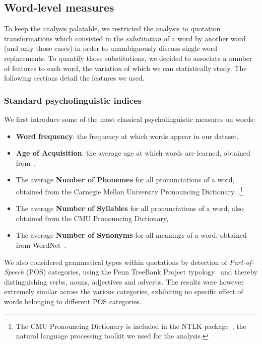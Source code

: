 \subsection{Word-level measures}

To keep the analysis palatable, we restricted the analysis to quotation transformations which consisted in the \emph{substitution} of a word by another word (and only those cases) in order to unambiguously discuss single word replacements. 
To quantify those substitutions, we decided to associate a number of features to each word, the variation of which we can statistically study.
The following sections detail the features we used.

\subsubsection{Standard psycholinguistic indices}

We first introduce some of the most classical psycholinguistic measures on words:


\begin{itemize}
    \item \textbf{Word frequency}: the frequency at which words appear in our dataset, 
    \item \textbf{Age of Acquisition}: the average age at which words are learned, obtained from~\citet{kuperman12},
    \item The average \textbf{Number of Phonemes} for all pronunciations of a word, obtained from the Carnegie Mellon University Pronouncing Dictionary~\citep{Weide98},\footnote{The CMU Pronouncing Dictionary is included in the NTLK package~\citep{Bird09}, the natural language processing toolkit we used for the analysis.}
    \item The average \textbf{Number of Syllables} for all pronunciations of a word, also obtained from the CMU Pronouncing Dictionary,
    \item The average \textbf{Number of Synonyms} for all meanings of a word, obtained from WordNet~\citep{WordNet10}. 
\end{itemize}

We also considered grammatical types within quotations by detection of \emph{Part-of-Speech} (POS) categories, using the Penn TreeBank Project typology~\citep{Santorini90} and thereby distinguishing verbs, nouns, adjectives and adverbs.
The results were however extremely similar across the various categories, exhibiting no specific effect of words belonging to different POS categories.

